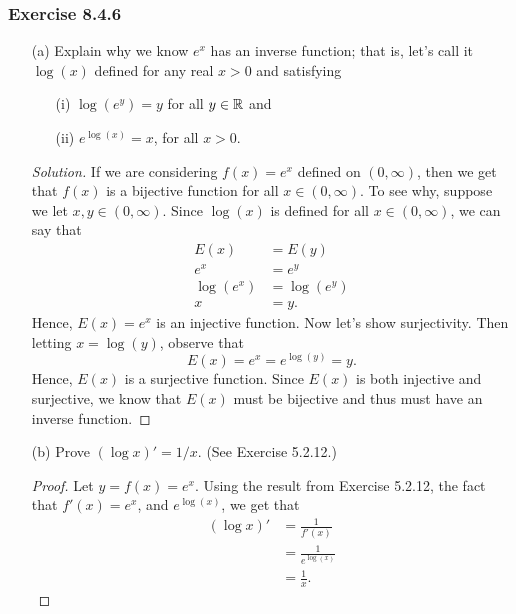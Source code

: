 \subsubsection{Exercise 8.4.6} 
\begin{enumerate}
    \item[(a)] Explain why we know \( e^{x}  \) has an inverse function; that is, let's call it \( \log(x)  \) defined for any real \(  x > 0  \) and satisfying
        \begin{enumerate}
            \item[(i)] \( \log(e^{y}) = y  \) for all \(  y\in \mathbb{R}  \) and 
            \item[(ii)] \( e^{\log(x)} = x  \), for all \( x > 0  \).
        \end{enumerate}
        \begin{proof}[Solution]
        If we are considering \( f(x) = e^{x} \) defined on \( (0,\infty ) \), then we get that \( f(x)  \) is a bijective function for all \( x \in (0, \infty ) \). To see why, suppose we let \( x, y \in (0,\infty )  \). Since \( \log(x)  \) is defined for all \(  x \in (0,\infty ) \), we can say that 
        \begin{align*}
            E(x) &= E(y) \\
             e^{x}    &= e^{y} \\
             \log(e^{x}) &= \log(e^{y}) \\
             x &= y. 
        \end{align*}
        Hence, \( E(x) = e^{x} \) is an injective function. Now let's show surjectivity. Then letting \( x = \log(y)  \), observe that 
        \[  E(x) = e^{x} = e^{\log(y)} = y. \] Hence, \( E(x)  \) is a surjective function. Since \( E(x)  \) is both injective and surjective, we know that \( E(x)  \) must be bijective and thus must have an inverse function.
        \end{proof}
    \item[(b)] Prove \( (\log x )' = 1 / x   \). (See Exercise 5.2.12.)
        \begin{proof}
        Let \( y = f(x) = e^{x} \). Using the result from Exercise 5.2.12, the fact that \( f'(x) = e^{x} \), and \( e^{\log(x)}  \), we get that 
        \begin{align*}
            (\log x)' &= \frac{ 1 }{ f'(x)  }  \\
                      &= \frac{ 1 }{ e^{\log(x)} } \\
                      &= \frac{ 1 }{ x }.
        \end{align*}

\end{proof}
\end{enumerate}
